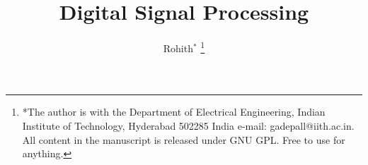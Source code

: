 \documentclass[journal,12pt,twocolumn]{IEEEtran}
\begin{document}
     \def\rightbox#1{\makebox[0in][r]{#1}}
     \def\centbox#1{\makebox[0in]{#1}}
     \def\topbox#1{\raisebox{-\baselineskip}[0in][0in]{#1}}
     \def\midbox#1{\raisebox{-0.5\baselineskip}[0in][0in]{#1}}
\vspace{3cm}
\title{ 
Digital Signal Processing
}
%
%
%
\author{ Rohith$^{*}$ %
\thanks{*The author is with the Department
of Electrical Engineering, Indian Institute of Technology, Hyderabad
502285 India e-mail:  gadepall@iith.ac.in.  All content in the manuscript is 
released under GNU GPL.  Free to use for anything. }%
}
% 
%
\end{document}
